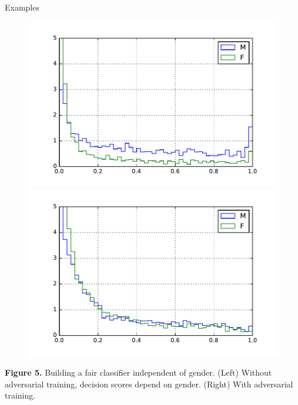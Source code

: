 \documentclass[final,unknownkeysallowed]{beamer}
\begin{document}
\begin{frame}{}
\begin{textblock}{0.32}
\begin{block}{Examples \phantom{p}}
\begin{figure}
\centering
\begin{minipage}{.42\linewidth}
    \begin{center}
        \includegraphics[width=\textwidth]{figures/gender-without.pdf}
    \end{center}
\end{minipage}
\hspace{.05\linewidth}
\begin{minipage}{.42\linewidth}
    \begin{center}
        \includegraphics[width=\textwidth]{figures/gender-with.pdf}
    \end{center}
\end{minipage}
\end{figure}
{\bf Figure 5.} Building a fair classifier independent of gender. (Left) Without adversarial training, decision scores depend on gender. (Right) With adversarial training.


\end{block}
\end{textblock}
\end{frame}
\end{document}
